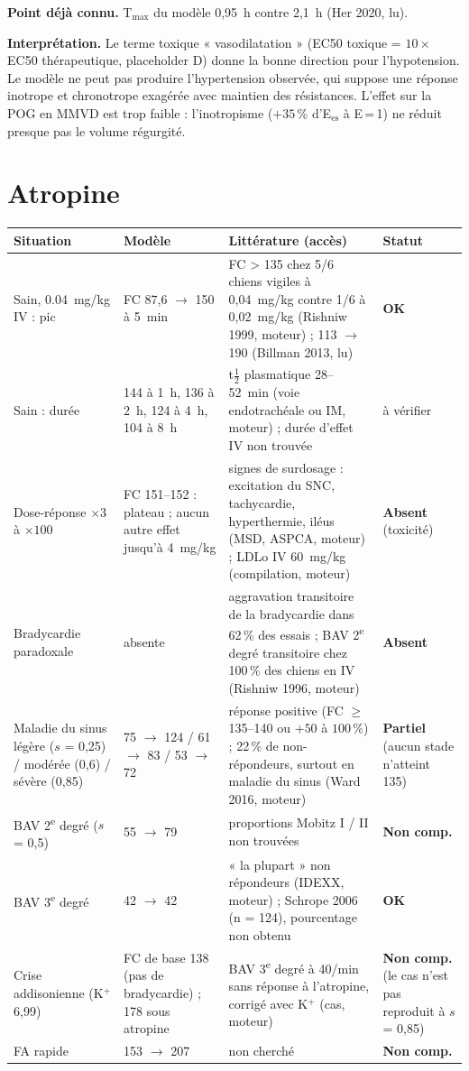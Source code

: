 \documentclass[10pt,a4paper]{article}
\newcommand{\ok}{\textcolor{green!45!black}{\textbf{OK}}}
\newcommand{\partiel}{\textcolor{orange!80!black}{\textbf{Partiel}}}
\newcommand{\nc}{\textcolor{black!60}{\textbf{Non comp.}}}
\newcommand{\absent}{\textcolor{red!70!black}{\textbf{Absent}}}
\begin{document}
\textbf{Point déjà connu.} T$_{\max}$ du modèle 0,95~h contre 2,1~h (Her 2020, lu).

\textbf{Interprétation.} Le terme toxique « vasodilatation » (EC50 toxique = $10\times$ EC50 thérapeutique, placeholder D) donne la bonne direction pour l'hypotension. Le modèle ne peut pas produire l'hypertension observée, qui suppose une réponse inotrope et chronotrope exagérée avec maintien des résistances. L'effet sur la POG en MMVD est trop faible : l'inotropisme ($+35$\,\% d'E$_\text{es}$ à E\,=\,1) ne réduit presque pas le volume régurgité.

\section{Atropine}

\begin{tabularx}{\linewidth}{@{}P{3.4cm}P{4.3cm}LP{1.8cm}@{}}
\toprule
Situation & Modèle & Littérature (accès) & Statut\\
\midrule\endhead
Sain, \SI{0,04}{mg/kg} IV : pic & FC 87,6 $\rightarrow$ 150 à 5~min & FC > 135 chez 5/6 chiens vigiles à 0,04~mg/kg contre 1/6 à 0,02~mg/kg (Rishniw 1999, moteur) ; 113 $\rightarrow$ 190 (Billman 2013, lu) & \ok{}\\
Sain : durée & 144 à 1~h, 136 à 2~h, 124 à 4~h, 104 à 8~h & t$\frac12$ plasmatique 28--52~min (voie endotrachéale ou IM, moteur) ; durée d'effet IV non trouvée & à vérifier\\
Dose-réponse $\times 3$ à $\times 100$ & FC 151--152 : plateau ; aucun autre effet jusqu'à 4~mg/kg & signes de surdosage : excitation du SNC, tachycardie, hyperthermie, iléus (MSD, ASPCA, moteur) ; LDLo IV 60~mg/kg (compilation, moteur) & \absent{} (toxicité)\\
Bradycardie paradoxale & absente & aggravation transitoire de la bradycardie dans 62\,\% des essais ; BAV 2\textsuperscript{e} degré transitoire chez 100\,\% des chiens en IV (Rishniw 1996, moteur) & \absent{}\\
Maladie du sinus légère ($s$ = 0,25) / modérée (0,6) / sévère (0,85) & 75 $\rightarrow$ 124 / 61 $\rightarrow$ 83 / 53 $\rightarrow$ 72 & réponse positive (FC $\geq$ 135--140 ou $+50$ à $100$\,\%) ; 22\,\% de non-répondeurs, surtout en maladie du sinus (Ward 2016, moteur) & \partiel{} (aucun stade n'atteint 135)\\
BAV 2\textsuperscript{e} degré ($s$ = 0,5) & 55 $\rightarrow$ 79 & proportions Mobitz I / II non trouvées & \nc{}\\
BAV 3\textsuperscript{e} degré & 42 $\rightarrow$ 42 & « la plupart » non répondeurs (IDEXX, moteur) ; Schrope 2006 (n = 124), pourcentage non obtenu & \ok{}\\
Crise addisonienne (K$^+$ 6,99) & FC de base 138 (pas de bradycardie) ; 178 sous atropine & BAV 3\textsuperscript{e} degré à 40/min sans réponse à l'atropine, corrigé avec K$^+$ (cas, moteur) & \nc{} (le cas n'est pas reproduit à $s$ = 0,85)\\
FA rapide & 153 $\rightarrow$ 207 & non cherché & \nc{}\\
\bottomrule
\end{tabularx}
\end{document}
